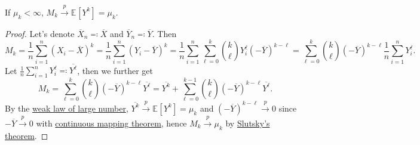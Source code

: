 \begin{proposition}\label{prop:sample-centered-moment-consistent}
	If \(\mu _k < \infty \), \(M_k \overset{p}{\to} \mathbb{E}_{}[Y^k] = \mu _k\).
\end{proposition}
\begin{proof}
	Let's denote \(\overline{X} _n \eqqcolon \overline{X} \) and \(\overline{Y} _n \eqqcolon \overline{Y} \). Then
	\[
		M_k
		= \frac{1}{n} \sum_{i=1}^{n} (X_i - \overline{X} )^k
		= \frac{1}{n} \sum_{i=1}^{n} (Y_i - \overline{Y} )^k
		= \frac{1}{n} \sum_{i=1}^{n} \sum_{\ell =0}^{k} \binom{k}{\ell } Y_i^{\ell } (-\overline{Y} )^{k-\ell }
		= \sum_{\ell =0}^{k} \binom{k}{\ell } (-\overline{Y} )^{k - \ell } \frac{1}{n} \sum_{i=1}^{n} Y_i^{\ell }.
	\]
	Let \(\frac{1}{n} \sum_{i=1}^{n} Y_i^{\ell } \eqqcolon \overline{Y^{\ell } } \), then we further get
	\[
		M_k
		= \sum_{\ell =0}^{k} \binom{k}{\ell } (- \overline{Y} )^{k - \ell } \overline{Y^{\ell } }
		= \overline{Y^k} + \sum_{\ell =0}^{k-1} \binom{k}{\ell } (-\overline{Y} )^{k-\ell }  \overline{Y^{\ell } }.
	\]
	By the \hyperref[thm:WLLN]{weak law of large number}, \(\overline{Y^k} \overset{p}{\to} \mathbb{E}_{}[Y^k] = \mu _k\) and \((-\overline{Y} )^{k-\ell } \overset{p}{\to} 0\) since \(-\overline{Y} \overset{p}{\to} 0\) with \hyperref[thm:continuous-mapping]{continuous mapping theorem}, hence \(M_k \overset{p}{\to} \mu _k\) by \hyperref[col:Slutsky]{Slutsky's theorem}.
\end{proof}

